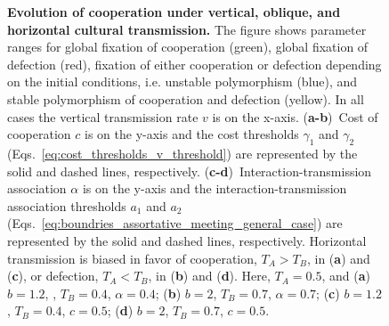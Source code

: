 \documentclass[12pt]{extarticle}
\begin{document}
\begin{figure}[p]
    \caption{\textbf{Evolution of cooperation under vertical, oblique, and horizontal cultural transmission.} 
    The figure shows parameter ranges for global fixation of cooperation (green), global fixation of defection (red), fixation of either cooperation or defection depending on the initial conditions, i.e. unstable polymorphism (blue), and stable polymorphism of cooperation and defection (yellow).
	In all cases the vertical transmission rate $v$ is on the x-axis.
	(\textbf{a-b})~Cost of cooperation $c$ is on the y-axis and the cost thresholds $\gamma_1$ and $\gamma_2$ (Eqs.~\ref{eq:cost_thresholds_v_threshold}) are represented by the solid and dashed lines, respectively. 
    (\textbf{c-d})~Interaction-transmission association $\alpha$ is on the y-axis and the interaction-transmission association thresholds $a_1$ and $a_2$ (Eqs.~\ref{eq:boundries_assortative_meeting_general_case}) are represented by the solid and dashed lines, respectively. 
    Horizontal transmission is biased in favor of cooperation, $T_A>T_B$, in (\textbf{a}) and (\textbf{c}), or defection, $T_A<T_B$, in (\textbf{b}) and (\textbf{d}).    
    Here, $T_A = 0.5$, and
    (\textbf{a}) $b=1.2$, , $T_B = 0.4$, $\alpha = 0.4$;
    (\textbf{b}) $b=2$, $T_B = 0.7$, $\alpha = 0.7$;
    (\textbf{c}) $b=1.2$, $T_B = 0.4$, $c=0.5$;
    (\textbf{d}) $b=2$, $T_B = 0.7$, $c=0.5$.
    }
    \label{fig:equilibria}
\end{figure}

\end{document}

